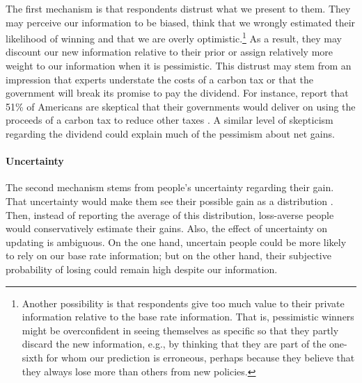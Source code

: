 \documentclass[12pt]{article} %
\begin{document}
The first mechanism is that respondents distrust what we present to them. They may perceive our information to be biased, think that we wrongly estimated their likelihood of winning and that we are overly optimistic.\footnote{Another possibility is that respondents give too much value to their private information relative to the base rate information. That is, pessimistic winners might be overconfident in seeing themselves as specific so that they partly discard the new information, e.g., by thinking that they are part of the one-sixth for whom our prediction is erroneous, perhaps because they believe that they always lose more than others from new policies.} As a result, they may discount our new information relative to their prior or assign relatively more weight to our information when it is pessimistic. This distrust may stem from an impression that experts understate the costs of a carbon tax or that the government will break its promise to pay the dividend. For instance, \cite{sapienza_zingales_2013} report that 51\% of Americans are skeptical that their governments would deliver on using the proceeds of a carbon tax to reduce other taxes \citep[see also][]{dresner_social_2006,hsu_pollution_2008}. A similar level of skepticism regarding the dividend could explain much of the pessimism about net gains.


\paragraph{Uncertainty}

The second mechanism stems from people's uncertainty regarding their gain. That uncertainty would make them see their possible gain as a distribution \citep[see][]{stiglitz_addressing_2019}. Then, instead of reporting the average of this distribution, loss-averse people would conservatively estimate their gains. Also, the effect of uncertainty on updating is ambiguous. On the one hand, uncertain people could be more likely to rely on our base rate information; but on the other hand, their subjective probability of losing could remain high despite our information.%

\end{document}
